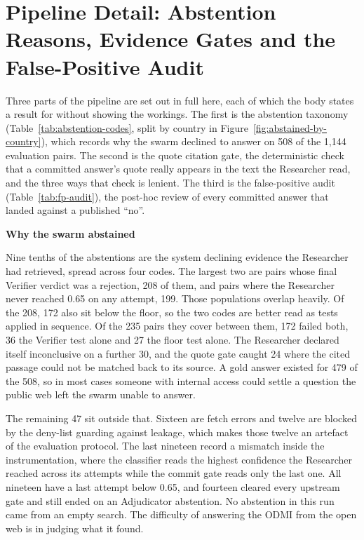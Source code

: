 \chapter{Pipeline Detail: Abstention Reasons, Evidence Gates and the False-Positive Audit}\label{app:pipeline-detail}

Three parts of the pipeline are set out in full here, each of which the body states a result for without showing the workings. The first is the abstention taxonomy (Table~\ref{tab:abstention-codes}, split by country in Figure~\ref{fig:abstained-by-country}), which records why the swarm declined to answer on 508 of the 1,144 evaluation pairs. The second is the quote citation gate, the deterministic check that a committed answer's quote really appears in the text the Researcher read, and the three ways that check is lenient. The third is the false-positive audit (Table~\ref{tab:fp-audit}), the post-hoc review of every committed answer that landed against a published ``no''.

\textbf{Why the swarm abstained}

Nine tenths of the abstentions are the system declining evidence the Researcher had retrieved, spread across four codes. The largest two are pairs whose final Verifier verdict was a rejection, 208 of them, and pairs where the Researcher never reached 0.65 on any attempt, 199. Those populations overlap heavily. Of the 208, 172 also sit below the floor, so the two codes are better read as tests applied in sequence. Of the 235 pairs they cover between them, 172 failed both, 36 the Verifier test alone and 27 the floor test alone. The Researcher declared itself inconclusive on a further 30, and the quote gate caught 24 where the cited passage could not be matched back to its source. A gold answer existed for 479 of the 508, so in most cases someone with internal access could settle a question the public web left the swarm unable to answer.

The remaining 47 sit outside that. Sixteen are fetch errors and twelve are blocked by the deny-list guarding against leakage, which makes those twelve an artefact of the evaluation protocol. The last nineteen record a mismatch inside the instrumentation, where the classifier reads the highest confidence the Researcher reached across its attempts while the commit gate reads only the last one. All nineteen have a last attempt below 0.65, and fourteen cleared every upstream gate and still ended on an Adjudicator abstention. No abstention in this run came from an empty search. The difficulty of answering the ODMI from the open web is in judging what it found.

